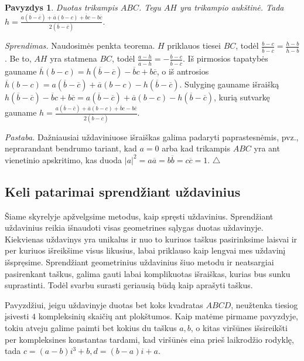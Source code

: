 \documentclass[11pt,a4paper,twoside]{book}
\newenvironment{sprendimas}{\noindent \textit{Sprendimas.}}{\hfill $\triangle$}
\newcounter{foo}[subsection]
\newtheorem{pavnr}[foo]{Pavyzdys}
\theoremstyle{definition} \newtheorem*{api}{Apibrėžimas}
\theoremstyle{remark} \newtheorem*{pastaba}{Pastaba}
\begin{document}
\begin{pavnr}
Duotas trikampis $ABC$. Tegu $AH$ yra trikampio aukštinė. Tada $h=\frac{a(\overline{b}-\overline{c})+\overline{a}(b-c)+\overline{b}c-b\overline{c}}{2(\overline{b}-\overline{c})}.$
\end{pavnr}
\begin{sprendimas}
Naudosimės penkta teorema. $H$ priklauos tiesei $BC$, todėl $\frac{b - c}{\overline{b} -\overline{c}}=\frac{h-b}{\overline{h} - \overline{b}}$. Be to, $AH$ yra statmena $BC$, todėl $\frac{a - h}{\overline{a} -\overline{h}}=-\frac{b - c}{\overline{b} - \overline{c}}$. Iš pirmosios tapatybės gauname $\overline{h}(b-c)=h(\overline{b} - \overline{c}) - \overline{b}c+b\overline{c}$, o iš antrosios $\overline{h}(b-c)=a(\overline{b}-\overline{c})+\overline{a}(b-c)-h(\overline{b}-\overline{c})$. Sulyginę gauname išraišką $h(\overline{b} - \overline{c}) - \overline{b}c+b\overline{c}=a(\overline{b}-\overline{c})+\overline{a}(b-c)-h(\overline{b}-\overline{c})$, kurią sutvarkę gauname $h=\frac{a(\overline{b}-\overline{c})+\overline{a}(b-c)+\overline{b}c-b\overline{c}}{2(\overline{b}-\overline{c})}$.

\textit {Pastaba.} Dažniausiai uždaviniuose išraiškas galima padaryti paprastesnėmis, pvz., neprarandant bendrumo tariant, kad $a=0$ arba kad trikampis $ABC$ yra ant vienetinio apskritimo, kas duoda $|a|^2=a\overline{a}=b\overline{b}=c\overline{c}=1$.
\end{sprendimas}


\subsection*{Keli patarimai sprendžiant uždavinius}

Šiame skyrelyje apžvelgsime metodus, kaip spręsti uždavinius. Sprendžiant uždavinius reikia išnaudoti visas geometrines sąlygas duotas uždavinyje. Kiekvienas uždavinys yra unikalus ir nuo to  kuriuos taškus pasirinksime laisvai ir per kuriuos išreikšime visus likusius, labai priklauso kaip lengvai mes uždavinį išspręsime. Sprendžiant geometrinius uždavinius šiuo metodu ir neatsargiai pasirenkant taškus, galima gauti labai komplikuotas išraiškas, kurias bus sunku suprastinti. Todėl svarbu surasti geriausią būdą kaip aprašyti taškus.



Pavyzdžiui, jeigu uždavinyje duotas bet koks kvadratas $ABCD$, neužtenka tiesiog įsivesti $4$ kompleksinių skaičių ant plokštumos. Kaip matėme pirmame pavyzdyje, tokiu atveju galime paimti bet kokius du taškus $a, b$, o kitas viršūnes išsireikšti per kompleksines konstantas tardami, kad viršūnės eina prieš laikrodžio rodyklę, tada $c=(a-b)i^3+b,  d=(b-a)i + a$.
\end{document}
